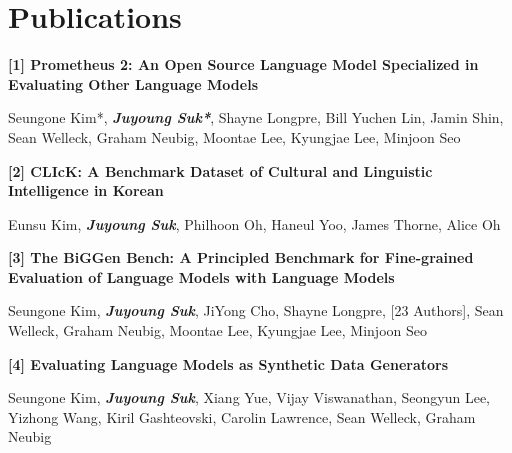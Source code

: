 \section{Publications}

\begin{onecolentry}{}
\textbf{[1] Prometheus 2: An Open Source Language Model Specialized in Evaluating Other Language Models}
\end{onecolentry}
\vspace{0.10 cm}
\begin{onecolentry}
Seungone Kim*, \textbf{\textit{Juyoung Suk*}}, Shayne Longpre, Bill Yuchen Lin, Jamin Shin, Sean Welleck, Graham Neubig, Moontae Lee, Kyungjae Lee, Minjoon Seo
\vspace{0.10 cm}
\end{onecolentry}



\vspace{0.2 cm}
\begin{onecolentry}
\textbf{[2] CLIcK: A Benchmark Dataset of Cultural and Linguistic Intelligence in Korean}
\end{onecolentry}
\vspace{0.10 cm}
\begin{onecolentry}
Eunsu Kim, \textbf{\textit{Juyoung Suk}}, Philhoon Oh, Haneul Yoo, James Thorne, Alice Oh
\vspace{0.10 cm}
\end{onecolentry}



\vspace{0.2 cm}
\begin{onecolentry}{}
\textbf{[3] The BiGGen Bench: A Principled Benchmark for Fine-grained Evaluation of Language Models with Language Models}
\end{onecolentry}
\vspace{0.10 cm}
\begin{onecolentry}
Seungone Kim, \textbf{\textit{Juyoung Suk}}, JiYong Cho, Shayne Longpre, [23 Authors], Sean Welleck, Graham Neubig, Moontae Lee, Kyungjae Lee, Minjoon Seo
\vspace{0.10 cm}
\end{onecolentry}



\vspace{0.2 cm}
\begin{onecolentry}{}
\textbf{[4] Evaluating Language Models as Synthetic Data Generators}
\end{onecolentry}
\vspace{0.10 cm}
\begin{onecolentry}
Seungone Kim, \textbf{\textit{Juyoung Suk}}, Xiang Yue, Vijay Viswanathan, Seongyun Lee, Yizhong Wang, Kiril Gashteovski, Carolin Lawrence, Sean Welleck, Graham Neubig
\vspace{0.10 cm}
\end{onecolentry}



